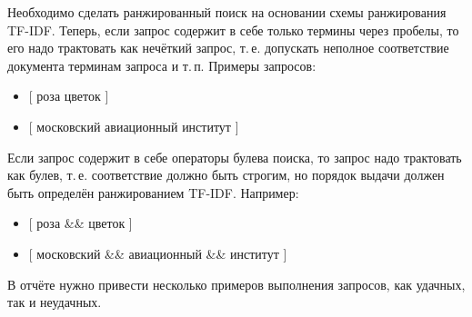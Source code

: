 \pagebreak
{}

Необходимо сделать ранжированный поиск на основании схемы ранжирования TF-IDF. Теперь, если запрос содержит в себе только термины через пробелы, то его надо трактовать как нечёткий запрос, т.\,е. допускать неполное соответствие документа терминам запроса и т.\,п. Примеры запросов:
\begin{itemize}
    \item {[} роза цветок {]}
    \item {[} московский авиационный институт {]}
\end{itemize}

Если запрос содержит в себе операторы булева поиска, то запрос надо трактовать как булев, т.\,е. соответствие должно быть строгим, но порядок выдачи должен быть определён ранжированием TF-IDF. Например:
\begin{itemize}
    \item {[} роза \&\& цветок {]}
    \item {[} московский \&\& авиационный \&\& институт {]}
\end{itemize}

В отчёте нужно привести несколько примеров выполнения запросов, как удачных, так и неудачных.
